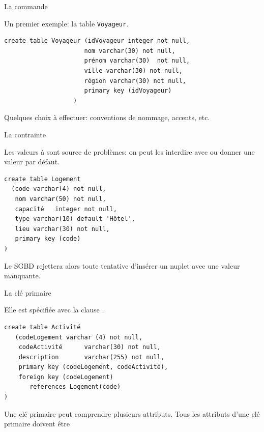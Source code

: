 
\begin{frame}[fragile]{La commande }

Un premier exemple: la table \texttt{Voyageur}.

\vfill

\begin{verbatim}
create table Voyageur (idVoyageur integer not null,
                      nom varchar(30) not null,
                      prénom varchar(30)  not null,
                      ville varchar(30) not null,
                      région varchar(30) not null,
                      primary key (idVoyageur)
                   )
\end{verbatim}

\vfill
Quelques choix à effectuer: conventions de nommage, accents, etc.

\end{frame}


\begin{frame}[fragile]{La contrainte }

Les valeurs à  sont source de problèmes: on peut les interdire
avec  ou donner une valeur par défaut.

\vfill

\begin{verbatim}
create table Logement 
  (code varchar(4) not null,
   nom varchar(50) not null,
   capacité   integer not null,
   type varchar(10) default 'Hôtel',
   lieu varchar(30) not null,
   primary key (code)
)
\end{verbatim}

\vfill
Le SGBD rejettera alors toute tentative d’insérer un nuplet avec une valeur manquante.

\end{frame}

\begin{frame}[fragile]{La clé primaire}

Elle est spécifiée avec la clause  .

\vfill

\begin{verbatim}
create table Activité 
   (codeLogement varchar (4) not null,
    codeActivité      varchar(30) not null,
    description       varchar(255) not null,
    primary key (codeLogement, codeActivité),
    foreign key (codeLogement) 
       references Logement(code)
)
\end{verbatim}

\vfill
Une clé primaire peut comprendre plusieurs attributs.
\vfill
Tous les attributs d'une clé primaire doivent être 

\end{frame}


